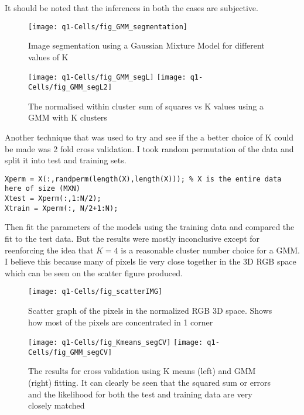 \documentclass{article}
\begin{document}
It should be noted that the inferences in both the cases are subjective.

\begin{figure}[h!]
	\centering
	\texttt{[image: q1-Cells/fig\_GMM\_segmentation]}
	\caption{Image segmentation using a Gaussian Mixture Model for different values of K}
\end{figure}

\begin{figure}[h!]
	\centering
	\texttt{[image: q1-Cells/fig\_GMM\_segL]}
	\texttt{[image: q1-Cells/fig\_GMM\_segL2]}
	\caption{The normalised within cluster sum of squares vs K values using a GMM with K clusters}
\end{figure}

Another technique that was used to try and see if the a better choice of K could be made was 2 fold cross validation. I took random permutation of the data and split it into test and training sets.

\begin{lstlisting}
Xperm = X(:,randperm(length(X),length(X))); % X is the entire data here of size (MXN)
Xtest = Xperm(:,1:N/2);
Xtrain = Xperm(:, N/2+1:N);
\end{lstlisting}

Then fit the parameters of the models using the training data and compared the fit to the test data. But the results were mostly inconclusive except for reenforcing the idea that $K=4$ is a reasonable cluster number choice for a GMM. I believe this because many of pixels lie very close together in the 3D RGB space which can be seen on the scatter figure produced. 

\begin{figure}[h!]
	\centering
	\texttt{[image: q1-Cells/fig\_scatterIMG]}
	\caption{Scatter graph of the pixels in the normalized RGB 3D space. Shows how most of the pixels are concentrated in 1 corner}
\end{figure}

\begin{figure}[h!]
	\centering
	\texttt{[image: q1-Cells/fig\_Kmeans\_segCV]}
	\texttt{[image: q1-Cells/fig\_GMM\_segCV]}
	\caption{The results for cross validation using K means (left) and GMM (right) fitting. It can clearly be seen that the squared sum or errors and the likelihood for both the test and training data are very closely matched}
\end{figure}
\end{document}
